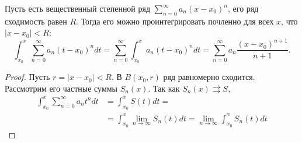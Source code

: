 \begin{thm}
	Пусть есть вещественный степенной ряд $ \sum_{n=0}^{\infty} a_{n}(x - x_0)^{n}$, его ряд сходимость равен $ R$.
	Тогда его можно проинтегрировать почленно для всех $ x$, что $ \lvert x - x_0 \rvert < R$:
	\[
		\int_{x_0}^{x} \sum_{n=0}^{\infty} a_{n} (t - x_0) ^{n} dt = \sum_{n=0}^{\infty} \int_{x_0}^{x} a_n (t - x_0)^{n} dt = \sum_{n=0}^{\infty} a_{n} \frac{(x-x_0)^{n+1}}{n+1} 
	.\] 
\end{thm}
\begin{proof}
	Пусть $ r = \lvert x - x_0 \rvert <R$. В $ \overline{B(x_0, r)}$ ряд равномерно сходится.
	Рассмотрим его частные суммы $ S_n(x)$. Так как  $ S_{n} (x) \rightrightarrows S$,
	\[
		\begin{aligned}
			\int_{x_0}^{x} \sum_{n=0}^{\infty} a_{n} t ^{n} dt &= \int_{x_0}^{x} S(t) dt = \\
															   & = \int_{x_0}^{x} \lim_{n \to \infty} S_n(t) dt 
															    = \lim_{n \to \infty} \int_{x_0}^{x} S_{n} (t) dt 
		\end{aligned}
	\] 
\end{proof}

